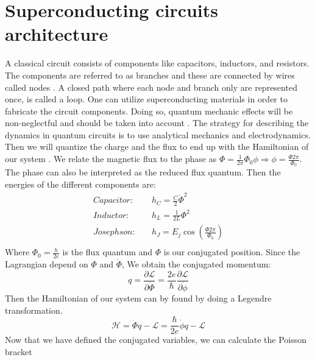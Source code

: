 \section{Superconducting circuits architecture}
    A classical circuit consists of components like capacitors, inductors, and resistors. The components are referred to as branches and these are connected by wires called nodes \cite{Griffiths2018}. A closed path where each node and branch only are represented once, is called a loop. One can utilize superconducting materials in order to fabricate the circuit components. Doing so, quantum mechanic effects will be non-neglectful and should be taken into account \cite{Girvin2014}. The strategy for describing the dynamics in quantum circuits is to use analytical mechanics and electrodynamics. Then we will quantize the charge and the flux to end up with the Hamiltonian of our system \cite{Krantz2019}. We relate the magnetic flux to the phase as  $\Phi= \frac{1}{2\pi}\Phi_{0} \phi \Rightarrow \phi = \frac{\Phi 2 \pi}{\Phi_0}$. The phase can also be interpreted as the reduced flux quantum. Then the energies of the different components are: 
    \begin{equation}
        \begin{aligned}
            Capacitor:& \quad h_C  = \frac{C}{2} \Dot{\Phi}^2     \\ 
            Inductor:& \quad h_L = \frac{1}{2 L} \Phi^2    \\
            Josephson:& \quad h_{J} = E_j \cos \left(\frac{\Phi 2 \pi}{\Phi_0} \right)    \\
        \end{aligned}
    \end{equation}
    Where $\Phi_{0}=\frac{h}{2e}$ is the flux quantum and $\Phi$ is our conjugated position. Since the Lagrangian depend on $\Phi$ and $\Dot{\Phi}$, We obtain the conjugated momentum:
    \begin{equation}
        q = \frac{\partial \mathcal{L}}{\partial \dot{\Phi}} = \frac{2 e}{\hbar} \frac{\partial \mathcal{L}}{\partial \dot{\phi}}
    \end{equation}
    Then the Hamiltonian of our system can by found by doing a Legendre transformation.
    \begin{equation}
        \mathcal{H}  =\dot{\Phi} q-\mathcal{L}=\frac{\hbar}{2 e} \dot{\phi} q-\mathcal{L}
    \end{equation}
    Now that we have defined the conjugated variables, we can calculate the Poisson bracket
    \\
